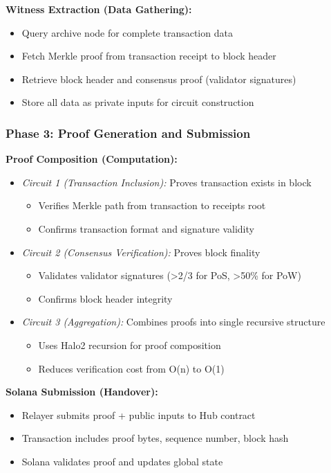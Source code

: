 \documentclass[11pt,a4paper]{article}
\begin{document}
\textbf{Witness Extraction (Data Gathering):}
\begin{itemize}
    \item Query archive node for complete transaction data
    \item Fetch Merkle proof from transaction receipt to block header
    \item Retrieve block header and consensus proof (validator signatures)
    \item Store all data as private inputs for circuit construction
\end{itemize}

\subsubsection*{Phase 3: Proof Generation and Submission}

\textbf{Proof Composition (Computation):}
\begin{itemize}
    \item \textit{Circuit 1 (Transaction Inclusion):} Proves transaction exists in block
        \begin{itemize}
            \item Verifies Merkle path from transaction to receipts root
            \item Confirms transaction format and signature validity
        \end{itemize}
    \item \textit{Circuit 2 (Consensus Verification):} Proves block finality
        \begin{itemize}
            \item Validates validator signatures (>2/3 for PoS, >50\% for PoW)
            \item Confirms block header integrity
        \end{itemize}
    \item \textit{Circuit 3 (Aggregation):} Combines proofs into single recursive structure
        \begin{itemize}
            \item Uses Halo2 recursion for proof composition
            \item Reduces verification cost from O(n) to O(1)
        \end{itemize}
\end{itemize}

\textbf{Solana Submission (Handover):}
\begin{itemize}
    \item Relayer submits proof + public inputs to Hub contract
    \item Transaction includes proof bytes, sequence number, block hash
    \item Solana validates proof and updates global state
\end{itemize}
\end{document}
